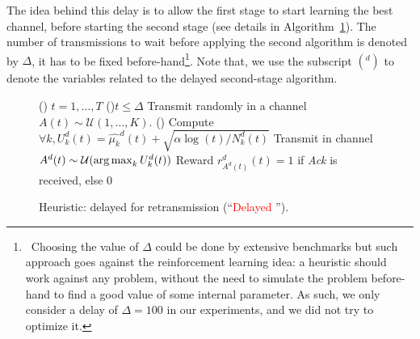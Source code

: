 The idea behind this delay is to allow the first stage \UCB{} to start learning the best channel, before starting the second stage \UCB{} (see details in Algorithm~\ref{algo:43:UCBwithDelay}).
The number of transmissions to wait before applying the second algorithm is denoted by $\Delta$, it has to be fixed before-hand\footnote{~Choosing the value of $\Delta$ could be done by extensive benchmarks but such approach goes against the reinforcement learning idea: a heuristic should work against any problem, without the need to simulate the problem before-hand to find a good value of some internal parameter. As such, we only consider a delay of $\Delta=100$ in our experiments, and we did not try to optimize it.}.
%
Note that, we use the subscript $({}^d)$ to denote the variables
related to the delayed second-stage \UCB{} algorithm.

\begin{figure}[h!]
	\centering
	\begin{framed}
	\begin{algorithm}[H]
		\For()
		{$t = 1, \dots, T$}{
			\uElseIf(){$t \leq \Delta$}{
				Transmit randomly in a channel $A(t) \sim \mathcal{U}(1,\ldots,K)$.
			}
			\uElse(){
				Compute $\forall k, U^d_k(t) = \widehat{\mu_k}^d(t) + \sqrt{\alpha \log(t) / N_k^d(t)}$\;
				Transmit in channel $A^d(t) \sim \mathcal{U}(\operatorname*{arg\,max}_k U^d_k(t))$\;
				Reward $r^d_{A^d(t)}(t) = 1$ if \emph{Ack} is received, else $0$\;
			}
		}
		\caption[Heuristic: delayed \UCB{} for retransmission.]{Heuristic: delayed \UCB{} for retransmission (``\textcolor{red}{Delayed \UCB}'').}
		\label{algo:43:UCBwithDelay}
	\end{algorithm}
	\end{framed}
\end{figure}


